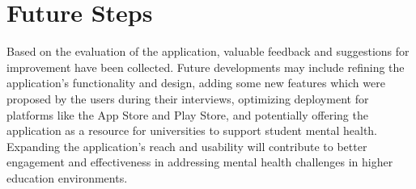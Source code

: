 \section{Future Steps}

Based on the evaluation of the application, valuable feedback and suggestions for improvement have been collected. Future developments may include refining the application’s functionality and design, adding some new features which were proposed by the users during their interviews, optimizing deployment for platforms like the App Store and Play Store, and potentially offering the application as a resource for universities to support student mental health. Expanding the application's reach and usability will contribute to better engagement and effectiveness in addressing mental health challenges in higher education environments.